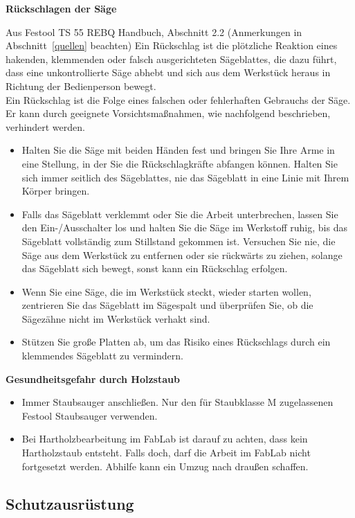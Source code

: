 \documentclass{\basedir/fablab-document}
\begin{document}
\textbf{Rückschlagen der Säge}
\begin{leftbar}{Aus Festool TS 55 REBQ Handbuch, Abschnitt 2.2 (Anmerkungen in Abschnitt~\ref{quellen} beachten)}
Ein Rückschlag ist die plötzliche Reaktion
eines hakenden, klemmenden oder falsch
ausgerichteten Sägeblattes, die dazu führt,
dass eine unkontrollierte Säge abhebt und
sich aus dem Werkstück heraus in Richtung der Bedienperson bewegt.\\
Ein Rückschlag ist die Folge eines falschen
oder fehlerhaften Gebrauchs der Säge. Er kann
durch geeignete Vorsichtsmaßnahmen, wie
nachfolgend beschrieben, verhindert werden.
\begin{itemize}
\item Halten Sie die Säge mit beiden Händen
fest und bringen Sie Ihre Arme in eine
Stellung, in der Sie die Rückschlagkräfte
abfangen können. Halten Sie sich immer
seitlich des Sägeblattes, nie das Sägeblatt
in eine Linie mit Ihrem Körper bringen. 
\item Falls das Sägeblatt verklemmt oder Sie
die Arbeit unterbrechen, lassen Sie den
Ein-/Ausschalter los und halten Sie die
Säge im Werkstoff ruhig, bis das Sägeblatt
vollständig zum Stillstand gekommen ist.
Versuchen Sie nie, die Säge aus dem
Werkstück zu entfernen oder sie rückwärts zu ziehen, solange das Sägeblatt
sich bewegt, sonst kann ein Rückschlag
erfolgen.
\item Wenn Sie eine Säge, die im Werkstück
steckt, wieder starten wollen, zentrieren
Sie das Sägeblatt im Sägespalt und überprüfen Sie, ob die Sägezähne nicht im
Werkstück verhakt sind. 
\item Stützen Sie große Platten ab, um das Risiko eines Rückschlags durch ein klemmendes Sägeblatt zu vermindern.

\end{itemize}
\end{leftbar}

\textbf{Gesundheitsgefahr durch Holzstaub}
\begin{itemize}
	\item Immer Staubsauger anschließen. Nur den für Staubklasse M zugelassenen Festool Staubsauger verwenden.
	\item Bei Hartholzbearbeitung im FabLab ist darauf zu achten, dass kein Hartholzstaub entsteht. Falls doch, darf die Arbeit im FabLab nicht fortgesetzt werden. Abhilfe kann ein Umzug nach draußen schaffen.
\end{itemize}

\subsection{Schutzausrüstung}
\end{document}
